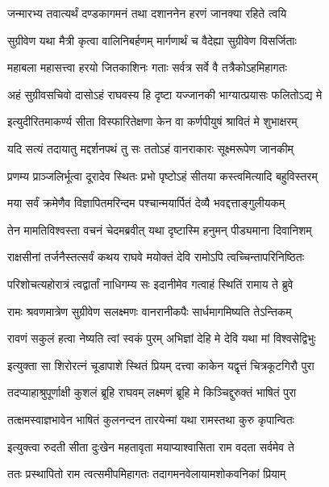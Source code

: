 \twolineshloka
{जन्मारभ्य तवात्यर्थं दण्डकागमनं तथा}
{दशाननेन हरणं जानक्या रहिते त्वयि} %

\twolineshloka
{सुग्रीवेण यथा मैत्री कृत्वा वालिनिबर्हणम्}
{मार्गणार्थं च वैदेह्या सुग्रीवेण विसर्जिताः} %

\twolineshloka
{महाबला महासत्त्वा हरयो जितकाशिनः}
{गताः सर्वत्र सर्वे वै तत्रैकोऽहमिहागतः} %

\twolineshloka
{अहं सुग्रीवसचिवो दासोऽहं राघवस्य हि}
{दृष्टा यज्जानकी भाग्यात्प्रयासः फलितोऽद्य मे} %

\twolineshloka
{इत्युदीरितमाकर्ण्य सीता विस्फारितेक्षणा}
{केन वा कर्णपीयुषं श्रावितं मे शुभाक्षरम्} %

\twolineshloka
{यदि सत्यं तदायातु मद्दर्शनपथं तु सः}
{ततोऽहं वानराकारः सूक्ष्मरूपेण जानकीम्} %

\twolineshloka
{प्रणम्य प्राञ्जलिर्भूत्वा दूरादेव स्थितः प्रभो}
{पृष्टोऽहं सीतया कस्त्वमित्यादि बहुविस्तरम्} %

\twolineshloka
{मया सर्वं क्रमेणैव विज्ञापितमरिन्दम}
{पश्चान्मयार्पितं देव्यै भवद्दत्ताङ्गुलीयकम्} %

\twolineshloka
{तेन मामतिविश्वस्ता वचनं चेदमब्रवीत्}
{यथा दृष्टास्मि हनुमन् पीड्यमाना दिवानिशम्} %

\twolineshloka
{राक्षसीनां तर्जनैस्तत्सर्वं कथय राघवे}
{मयोक्तं देवि रामोऽपि त्वच्चिन्तापरिनिष्ठितः} %

\twolineshloka
{परिशोचत्यहोरात्रं त्वद्वार्तां नाधिगम्य सः}
{इदानीमेव गत्वाहं स्थितिं रामाय ते ब्रुवे} %

\twolineshloka
{रामः श्रवणमात्रेण सुग्रीवेण सलक्ष्मणः}
{वानरानीकपैः सार्धमागमिष्यति तेऽन्तिकम्} %

\twolineshloka
{रावणं सकुलं हत्वा नेष्यति त्वां स्वकं पुरम्}
{अभिज्ञां देहि मे देवि यथा मां विश्वसेद्विभुः} %

\twolineshloka
{इत्युक्ता सा शिरोरत्नं चूडापाशे स्थितं प्रियम्}
{दत्त्वा काकेन यद्वृत्तं चित्रकूटगिरौ पुरा} %

\twolineshloka
{तदप्याहाश्रुपूर्णाक्षी कुशलं ब्रूहि राघवम्}
{लक्ष्मणं ब्रूहि मे किञ्चिद्दुरुक्तं भाषितं पुरा} %

\twolineshloka
{तत्क्षमस्वाज्ञभावेन भाषितं कुलनन्दन}
{तारयेन्मां यथा रामस्तथा कुरु कृपान्वितः} %

\twolineshloka
{इत्युक्त्वा रुदती सीता दुःखेन महतावृता}
{मयाप्याश्वासिता राम वदता सर्वमेव ते} %

\twolineshloka
{ततः प्रस्थापितो राम त्वत्समीपमिहागतः}
{तदागमनवेलायामशोकवनिकां प्रियाम्} %

